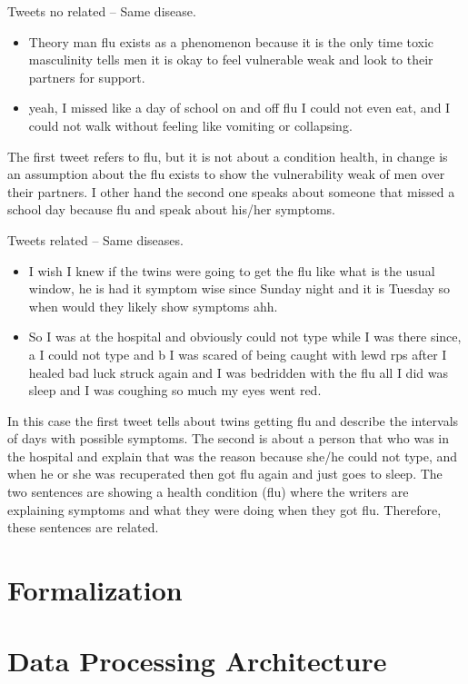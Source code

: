 \documentclass[12pt]{report}
\begin{document}
\begin{definition} Tweets no related – Same disease.
	\begin{itemize}[nolistsep]
		\item Theory man flu exists as a phenomenon because it is the only time toxic masculinity tells men it is okay to feel vulnerable weak and look to their partners for support.
		\item yeah, I missed like a day of school on and off flu I could not even eat, and I could not walk without feeling like vomiting or collapsing.
	\end{itemize}
\end{definition}
The first tweet refers to flu, but it is not about a condition health, in change is an assumption about the flu exists to show the vulnerability weak of men over their partners. I other hand the second one speaks about someone that missed a school day because flu and speak about his/her symptoms.


\begin{definition} Tweets related – Same diseases.
	\begin{itemize}[nolistsep]
		\item I wish I knew if the twins were going to get the flu like what is the usual window, he is had it symptom wise since Sunday night and it is Tuesday so when would they likely show symptoms ahh.
		\item So I was at the hospital and obviously could not type while I was there since, a I could not type and b I was scared of being caught with lewd rps after I healed bad luck struck again and I was bedridden with the flu all I did was sleep and I was coughing so much my eyes went red.
	\end{itemize}
\end{definition}
In this case the first tweet tells about twins getting flu and describe the intervals of days with possible symptoms. The second is about a person that who was in the hospital and explain that was the reason because she/he could not type, and when he or she was recuperated then got flu again and just goes to sleep. The two sentences are showing a health condition (flu) where the writers are explaining symptoms and what they were doing when they got flu. Therefore, these sentences are related.

\section{Formalization}
\section{Data Processing Architecture}
\end{document}
